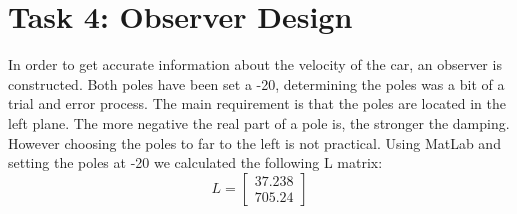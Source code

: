 \documentclass[final]{scrreprt} %
\begin{document}
\section*{Task 4: Observer Design}
In order to get accurate information about the velocity of the car, an observer is constructed. Both poles have been set a -20, determining the poles was a bit of a trial and error process. The main requirement is that the poles are located in the left plane. The more negative the real part of a pole is, the stronger the damping. However choosing the poles to far to the left is not practical. Using MatLab and setting the poles at -20 we calculated the following L matrix:
\begin{equation}
L=
\begin{bmatrix}
  37.238 \\
  705.24
 \end{bmatrix}
\end{equation}
\end{document}
